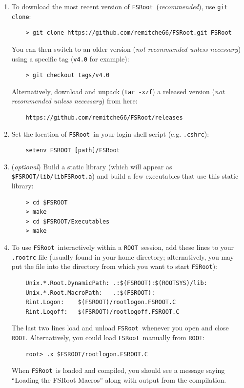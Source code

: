 \documentclass[11pt]{article}
\newcommand{\FSR}{{\tt FSRoot}}
\newcommand{\ROOT}{{\tt ROOT}}
\begin{document}
\begin{enumerate}

\item To download the most recent version of \FSR\ ({\it recommended}), use {\tt git clone}:
\begin{verbatim}
    > git clone https://github.com/remitche66/FSRoot.git FSRoot
\end{verbatim}
You can then switch to an older version ({\it not recommended unless necessary})
using a specific tag ({\tt v4.0} for example):
\begin{verbatim}
    > git checkout tags/v4.0
\end{verbatim}
Alternatively, download and unpack ({\tt tar -xzf}) a released version ({\it not recommended unless necessary}) from here:
\begin{verbatim}
    https://github.com/remitche66/FSRoot/releases
\end{verbatim}


\item Set the location of \FSR\ in your login shell script (e.g. {\tt .cshrc}):
\begin{verbatim}
    setenv FSROOT [path]/FSRoot
\end{verbatim}

\item ({\it optional}) Build a static library (which will appear as {\tt \$FSROOT/lib/libFSRoot.a}) and build a few executables that use this static library:
\begin{verbatim}
    > cd $FSROOT
    > make
    > cd $FSROOT/Executables
    > make
\end{verbatim}
 

\item To use \FSR\ interactively within a \ROOT\ session, add these lines to your {\tt .rootrc} file (usually found in your home directory; alternatively, you may put the file into the directory from which you want to start \FSR):
\begin{verbatim}
    Unix.*.Root.DynamicPath: .:$(FSROOT):$(ROOTSYS)/lib:
    Unix.*.Root.MacroPath:   .:$(FSROOT):
    Rint.Logon:    $(FSROOT)/rootlogon.FSROOT.C
    Rint.Logoff:   $(FSROOT)/rootlogoff.FSROOT.C
\end{verbatim}
The last two lines load and unload \FSR\ whenever you open and close \ROOT.
Alternatively, you could load \FSR\ manually from \ROOT:
\begin{verbatim}
    root> .x $FSROOT/rootlogon.FSROOT.C
\end{verbatim}
When \FSR\ is loaded and compiled, you should see a message saying ``Loading the FSRoot Macros'' along with output from the compilation.  


\end{enumerate}
\end{document}
